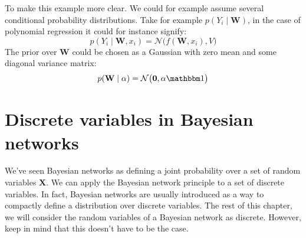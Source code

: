 \begin{exmp}
\begin{figure}[h!]
\end{figure}

\noindent
To make this example more clear. We could for example assume several
conditional probability distributions. Take for example 
$p(Y_i \mid \textbf{W})$, in the case of polynomial regression
it could for instance signify:
\begin{equation}
p(Y_i \mid \textbf{W}, x_i) = \mathcal{N}\big(f(\textbf{W}, x_i), V\big)
\end{equation}
The prior over $\textbf{W}$ could be chosen as a Gaussian with
zero mean and some diagonal variance matrix:
\begin{equation}
p(\textbf{W} \mid \alpha) = \mathcal{N}\big( \textbf{0}, \alpha \ID\big)
\end{equation}
\end{exmp}

\section{Discrete variables in Bayesian networks}
We've seen Bayesian networks as defining a joint probability
over a set of random variables $\textbf{X}$. We can apply
the Bayesian network principle to a set of discrete variables.
In fact, Bayesian networks are usually introduced as a way to
compactly define a distribution over discrete variables.
The rest of this chapter, we will consider the random variables
of a Bayesian network as discrete. However, keep in mind that 
this doesn't have to be the case.

